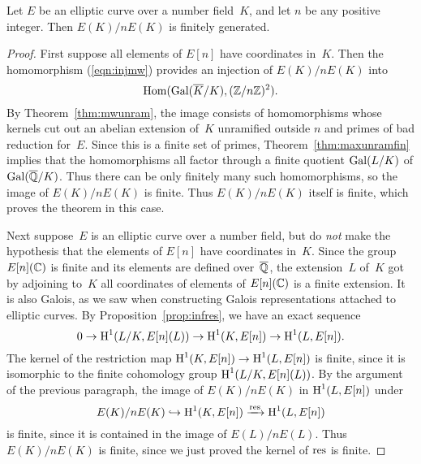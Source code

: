 \begin{theorem}\label{thm:weakMW}
	Let $E$ be an elliptic curve over a number field~$K$, and
	let $n$ be any positive integer.  Then
	$E(K)/nE(K)$ is finitely generated.
\end{theorem}
\begin{proof}
	First suppose all elements of $E[n]$ have coordinates in~$K$.  Then
	the homomorphism (\ref{eqn:injmw}) provides an injection of $E(K)/n
	E(K)$ into
	$$
		\operatorname{Hom}(\operatorname{Gal}(\overline{K}/K), (\mathbb{Z}/n\mathbb{Z})^2).
	$$
	By Theorem~\ref{thm:mwunram}, the image consists of homomorphisms whose
	kernels cut out an abelian extension of~$K$ unramified outside $n$
	and primes of bad reduction for~$E$.  Since this is a finite set of
	primes, Theorem~\ref{thm:maxunramfin} implies that the homomorphisms
	all factor through a finite quotient $\operatorname{Gal}(L/K)$ of $\operatorname{Gal}(\overline{\mathbb{Q}}/K)$.
	Thus there can be only finitely many such homomorphisms, so the
	image of $E(K)/nE(K)$ is finite.  Thus $E(K)/nE(K)$ itself is
	finite, which proves the theorem in this case.
	
	Next suppose~$E$ is an elliptic curve over a number field, but do {\em
	not} make the hypothesis that the elements of $E[n]$ have
	coordinates in~$K$.  Since the group $E[n](\mathbb{C})$ is finite and its
	elements are defined over~$\overline{\mathbb{Q}}$, the extension~$L$ of~$K$ got by
	adjoining to~$K$ all coordinates of elements of $E[n](\mathbb{C})$ is a finite
	extension.  It is also Galois, as we saw when constructing Galois
	representations attached to elliptic curves.
	By Proposition~\ref{prop:infres}, we have an exact sequence
	$$
		0 \to \operatorname{H}^1(L/K, E[n](L))\to   \operatorname{H}^1(K,E[n])\to \operatorname{H}^1(L,E[n]).
	$$
	The kernel of the restriction map
	$\operatorname{H}^1(K,E[n])\to \operatorname{H}^1(L,E[n])$ is finite, since it is
	isomorphic to the finite cohomology group
	$\operatorname{H}^1(L/K, E[n](L))$.  By the argument of the previous
	paragraph, the image of $E(K)/nE(K)$ in $\operatorname{H}^1(L,E[n])$
	under
	$$
		E(K)/n E(K) \hookrightarrow \operatorname{H}^1(K,E[n]) \xrightarrow{\operatorname{res}} \operatorname{H}^1(L,E[n])
	$$
	is finite, since it is contained in the image of $E(L)/n E(L)$.
	Thus $E(K)/n E(K)$ is finite, since we just proved
	the kernel of $\operatorname{res}$ is finite.
\end{proof}
